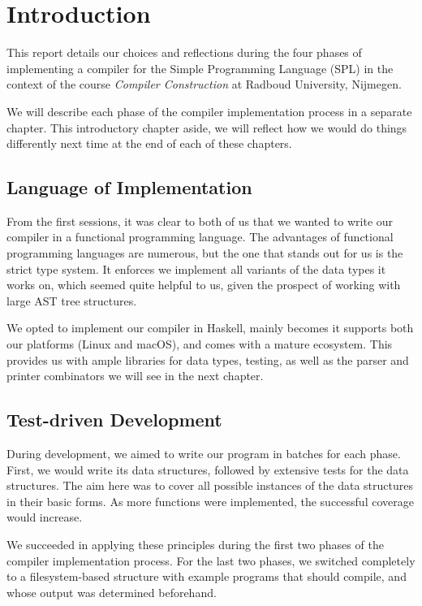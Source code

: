 \chapter{Introduction}

This report details our choices and reflections during the four phases of implementing a compiler for the Simple Programming Language (SPL) in the context of the course \emph{Compiler Construction} at Radboud University, Nijmegen.

We will describe each phase of the compiler implementation process in a separate chapter.
This introductory chapter aside, we will reflect how we would do things differently next time at the end of each of these chapters.

\section{Language of Implementation}

From the first sessions, it was clear to both of us that we wanted to write our compiler in a functional programming language.
The advantages of functional programming languages are numerous, but the one that stands out for us is the strict type system.
It enforces we implement all variants of the data types it works on, which seemed quite helpful to us, given the prospect of working with large AST tree structures.

We opted to implement our compiler in Haskell, mainly becomes it supports both our platforms (Linux and macOS), and comes with a mature ecosystem.
This provides us with ample libraries for data types, testing, as well as the parser and printer combinators we will see in the next chapter.


\section{Test-driven Development}

During development, we aimed to write our program in batches for each phase.
First, we would write its data structures, followed by extensive tests for the data structures.
The aim here was to cover all possible instances of the data structures in their basic forms.
As more functions were implemented, the successful coverage would increase.

We succeeded in applying these principles during the first two phases of the compiler implementation process.
For the last two phases, we switched completely to a filesystem-based structure with example programs that should compile, and whose output was determined beforehand.


